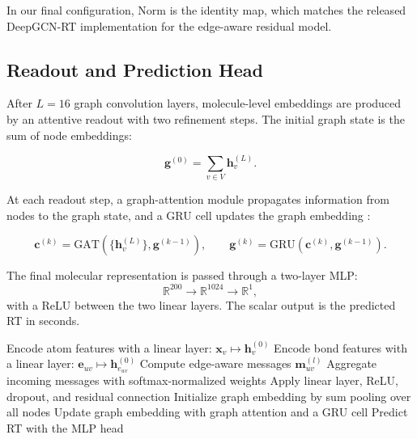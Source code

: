 In our final configuration, \(\mathrm{Norm}\) is the identity map, which matches the released DeepGCN-RT implementation for the edge-aware residual model.

\subsection{Readout and Prediction Head}

After \(L=16\) graph convolution layers, molecule-level embeddings are produced by an attentive readout with two refinement steps. The initial graph state is the sum of node embeddings:

\begin{equation}
    \mathbf{g}^{(0)} = \sum_{v \in V} \mathbf{h}^{(L)}_v .
\end{equation}

At each readout step, a graph-attention module propagates information from nodes to the graph state, and a GRU cell updates the graph embedding \cite{xiong2019}:

\begin{equation}
    \mathbf{c}^{(k)} = \mathrm{GAT}\!\left(\{\mathbf{h}^{(L)}_v\}, \mathbf{g}^{(k-1)}\right),
    \qquad
    \mathbf{g}^{(k)} = \mathrm{GRU}\!\left(\mathbf{c}^{(k)}, \mathbf{g}^{(k-1)}\right).
\end{equation}

The final molecular representation is passed through a two-layer MLP:
\[
    \mathbb{R}^{200} \rightarrow \mathbb{R}^{1024} \rightarrow \mathbb{R}^{1},
\]
with a ReLU between the two linear layers. The scalar output is the predicted RT in seconds.

\begin{algorithm}[t]
    \caption{Forward Pass of Our DeepGCN-RT Reimplementation}
    \begin{algorithmic}[1]
        \State Encode atom features with a linear layer: \(\mathbf{x}_v \mapsto \mathbf{h}^{(0)}_v\)
        \State Encode bond features with a linear layer: \(\mathbf{e}_{uv} \mapsto \mathbf{h}^{(0)}_{e_{uv}}\)
        \State Compute edge-aware messages \(\mathbf{m}^{(l)}_{uv}\)
        \State Aggregate incoming messages with softmax-normalized weights
        \State Apply linear layer, ReLU, dropout, and residual connection
        \EndFor
        \State Initialize graph embedding by sum pooling over all nodes
        \State Update graph embedding with graph attention and a GRU cell
        \EndFor
        \State Predict RT with the MLP head
    \end{algorithmic}
\end{algorithm}

